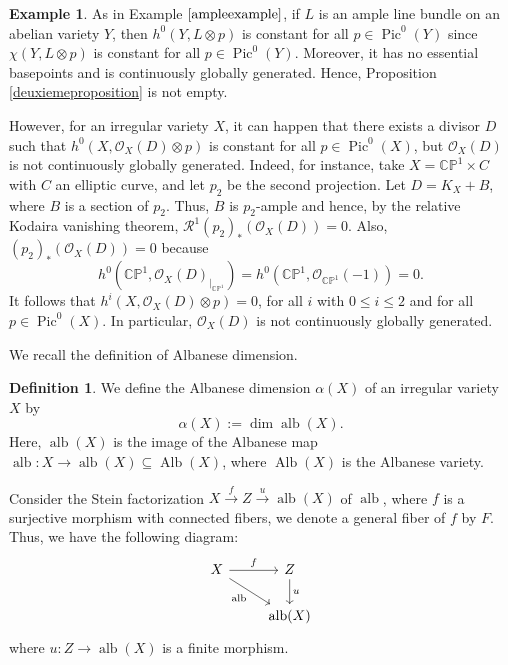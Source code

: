 \documentclass[sn-mathphys-num]{sn-jnl}%
\theoremstyle{definition}
\newtheorem{defn}[theorem]{Definition}
\newtheorem{example}[theorem]{Example}
\numberwithin{equation}{section}
\begin{document}
\begin{example}
As in Example $\ref{ampleexample}$, if $L$ is an ample line bundle on an abelian variety $Y$, then $h^{0}(Y, L \otimes p)$ is constant for all $p \in \operatorname{Pic}^{0}(Y)$ since $\chi(Y, L \otimes p)$ is constant for all $p \in \operatorname{Pic}^{0}(Y)$. Moreover, it has no essential basepoints and is continuously globally generated. Hence, Proposition \ref{deuxiemeproposition} is not empty. 
\par However, for an irregular variety $X$, it can happen that there exists a divisor $D$ such that $h^{0}(X, \mathcal{O}_{X}(D)\otimes p)$ is constant for all $p \in \operatorname{Pic}^{0}(X)$, but $\mathcal{O}_{X}(D)$ is not continuously globally generated. Indeed, for instance, take $X = \mathbb{CP}^{1} \times C$ with $C$ an elliptic curve, and let $p_{2}$ be the second projection. Let $D = K_{X} +B$, where $B$ is a section of $p_{2}$. Thus, $B$ is $p_{2}$-ample and hence, by the relative Kodaira vanishing theorem, $\mathcal{R}^{1}(p_{2})_{*}(\mathcal{O}_{X}(D)) =0$. Also, $(p_{2})_{*}(\mathcal{O}_{X}(D)) = 0$ because $$h^0(\mathbb{CP}^1, \mathcal{O}_{X}(D)_{|_{\mathbb{CP}^1}})= h^0(\mathbb{CP}^1, \mathcal{O}_{\mathbb{CP}^1}(-1)) = 0.$$ 
It follows that $h^{i}(X, \mathcal{O}_{X}(D) \otimes p) = 0$, for all $i$ with $0 \leq i \leq 2$ and for all $p \in \operatorname{Pic}^{0}(X)$. In particular, $\mathcal{O}_{X}(D)$ is not continuously globally generated.
\end{example}

\par We recall the definition of Albanese dimension.
\begin{defn}\label{dimensionalbanese}
    We define the Albanese dimension $\alpha(X)$ of an irregular variety $X$ by 
    \[
    \alpha(X):= \dim \operatorname{alb}(X).
    \]
    Here, $\operatorname{alb}(X)$ is the image of the Albanese map $\operatorname{alb}: X \to \operatorname{alb}(X) \subseteq \operatorname{Alb}(X)$, where $\operatorname{Alb}(X)$ is the Albanese variety.
\end{defn}
\par Consider the Stein factorization $X \xrightarrow{f} Z \xrightarrow{u} \operatorname{alb}(X)$ of $\operatorname{alb}$, where $f$ is a surjective morphism  with connected fibers, we denote a general fiber of $f$ by $F$. Thus, we have the following diagram:
\begin{equation}\label{diagram}
\begin{tikzcd}
X \arrow[r, "f"]
\arrow{rd}[swap]{\operatorname{alb}} & Z \arrow[d,"u"]\\
& \operatorname{alb}(X)
\end{tikzcd}
\end{equation}
where $u: Z \to \operatorname{alb}(X)$ is a finite morphism.
\end{document}
